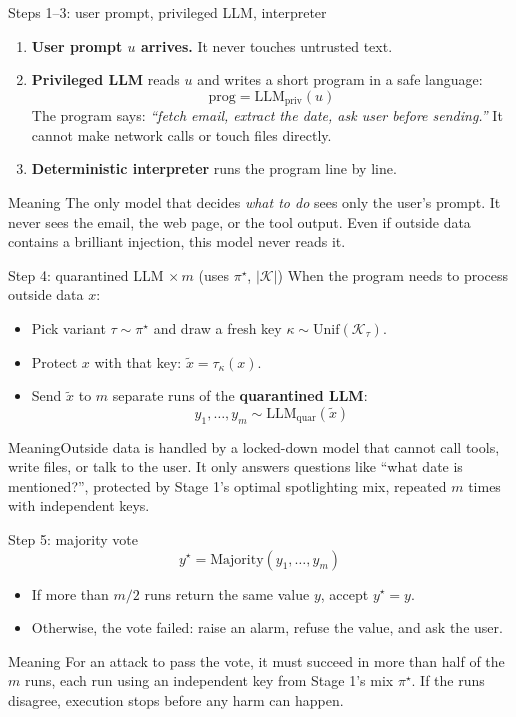 \documentclass[aspectratio=169,11pt]{beamer}
\newcommand{\plain}[1]{\begin{block}{Meaning}#1\end{block}}
\begin{document}
\begin{frame}{Steps 1--3: user prompt, privileged LLM, interpreter}
  \small
  \begin{enumerate}
    \item \textbf{User prompt $u$ arrives.} It never touches untrusted text.
    \item \textbf{Privileged LLM} reads $u$ and writes a short program in a safe language:
    \[
      \text{prog} = \mathrm{LLM}_{\mathrm{priv}}(u)
    \]
    The program says: \emph{``fetch email, extract the date, ask user before sending.''} It cannot make network calls or touch files directly.
    \item \textbf{Deterministic interpreter} runs the program line by line.
  \end{enumerate}
  \begin{block}{Meaning}
    The only model that decides \emph{what to do} sees only the user's prompt. It never sees the email, the web page, or the tool output. Even if outside data contains a brilliant injection, this model never reads it.
  \end{block}
\end{frame}

\begin{frame}{Step 4: quarantined LLM $\times\, m$ \;(uses $\pi^\star$, $|\mathcal{K}|$)}
  \small
  When the program needs to process outside data $x$:
  \begin{itemize}
    \item Pick variant $\tau \sim \pi^\star$ and draw a fresh key $\kappa \sim \mathrm{Unif}(\mathcal{K}_\tau)$.
    \item Protect $x$ with that key: $\tilde x = \tau_\kappa(x)$.
    \item Send $\tilde x$ to $m$ separate runs of the \textbf{quarantined LLM}:
    \[
      y_1, \dots, y_m \sim \mathrm{LLM}_{\mathrm{quar}}(\tilde x)
    \]
  \end{itemize}
  \plain{Outside data is handled by a locked-down model that cannot call tools, write files, or talk to the user. It only answers questions like ``what date is mentioned?'', protected by Stage 1's optimal spotlighting mix, repeated $m$ times with independent keys.}
\end{frame}

\begin{frame}{Step 5: majority vote}
  \[
    y^\star = \mathrm{Majority}(y_1, \dots, y_m)
  \]
  \small
  \begin{itemize}
    \item If more than $m/2$ runs return the same value $y$, accept $y^\star = y$.
    \item Otherwise, the vote failed: raise an alarm, refuse the value, and ask the user.
  \end{itemize}
  \begin{block}{Meaning}
    For an attack to pass the vote, it must succeed in more than half of the $m$ runs, each run using an independent key from Stage 1's mix $\pi^\star$. If the runs disagree, execution stops before any harm can happen.
  \end{block}
\end{frame}
\end{document}
